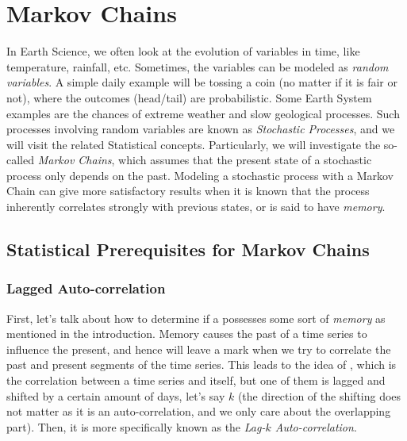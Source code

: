 \chapter{Markov Chains}
\label{chapter:Markov}

In Earth Science, we often look at the evolution of variables in time, like temperature, rainfall, etc. Sometimes, the variables can be modeled as \textit{random variables}. A simple daily example will be tossing a coin (no matter if it is fair or not), where the outcomes (head/tail) are probabilistic. Some Earth System examples are the chances of extreme weather and slow geological processes. Such processes involving random variables are known as \textit{Stochastic Processes}, and we will visit the related Statistical concepts. Particularly, we will investigate the so-called \textit{Markov Chains}, which assumes that the present state of a stochastic process only depends on the past. Modeling a stochastic process with a Markov Chain can give more satisfactory results when it is known that the process inherently correlates strongly with previous states, or is said to have \textit{memory}.

\section{Statistical Prerequisites for Markov Chains}

\subsection{Lagged Auto-correlation}

First, let's talk about how to determine if a  possesses some sort of \textit{memory} as mentioned in the introduction. Memory causes the past of a time series to influence the present, and hence will leave a mark when we try to correlate the past and present segments of the time series. This leads to the idea of , which is the correlation between a time series and itself, but one of them is lagged and shifted by a certain amount of days, let's say $k$ (the direction of the shifting does not matter as it is an auto-correlation, and we only care about the overlapping part). Then, it is more specifically known as the \textit{Lag-$k$ Auto-correlation}.

